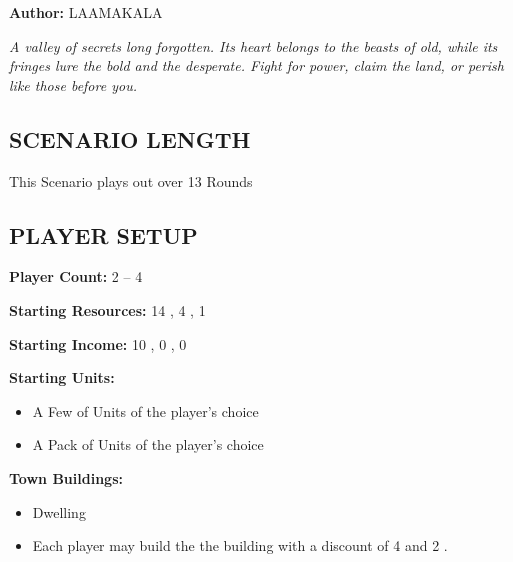 
\begin{multicols*}{2}

\textbf{Author:} LAAMAKALA


\textit{A valley of secrets long forgotten. Its heart belongs to the beasts of old, while its fringes lure the bold and the desperate. Fight for power, claim the land, or perish like those before you.}


\subsection*{\MakeUppercase{Scenario Length}}
This Scenario plays out over 13 Rounds 

\subsection*{\MakeUppercase{Player Setup}}
\textbf{Player Count:} 2 -- 4

\textbf{Starting Resources:} 14 , 4 , 1 

\textbf{Starting Income:} 10 , 0 , 0 

\textbf{Starting Units:}
\begin{itemize}
  \item A Few of  Units of the player's choice
  \item A Pack of  Units of the player's choice
\end{itemize}

\textbf{Town Buildings:}
\begin{itemize}
  \item {} Dwelling
  \item Each player may build the the  building with a discount of 4  and 2 .
\end{itemize}


\end{multicols*}
